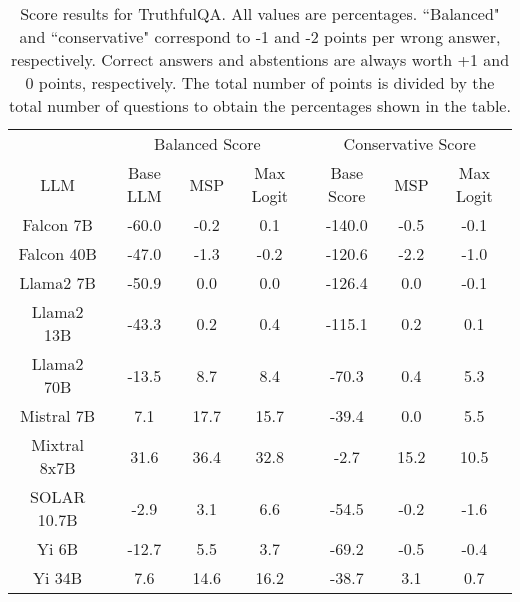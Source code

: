 \renewcommand\arraystretch{1.2}
\begin{table*}
\centering
\begin{tabular}{c|c|c|c|c|c|c}
& \multicolumn{3}{c|}{Balanced Score} & \multicolumn{3}{c}{Conservative Score} \\ 
LLM & Base LLM & MSP & Max Logit & Base Score & MSP & Max Logit\\ \hline
Falcon 7B & -60.0 & -0.2 & 0.1 & -140.0 & -0.5 & -0.1\\
Falcon 40B & -47.0 & -1.3 & -0.2 & -120.6 & -2.2 & -1.0\\
Llama2 7B & -50.9 & 0.0 & 0.0 & -126.4 & 0.0 & -0.1\\
Llama2 13B & -43.3 & 0.2 & 0.4 & -115.1 & 0.2 & 0.1\\
Llama2 70B & -13.5 & 8.7 & 8.4 & -70.3 & 0.4 & 5.3\\
Mistral 7B & 7.1 & 17.7 & 15.7 & -39.4 & 0.0 & 5.5\\
Mixtral 8x7B & 31.6 & 36.4 & 32.8 & -2.7 & 15.2 & 10.5\\
SOLAR 10.7B & -2.9 & 3.1 & 6.6 & -54.5 & -0.2 & -1.6\\
Yi 6B & -12.7 & 5.5 & 3.7 & -69.2 & -0.5 & -0.4\\
Yi 34B & 7.6 & 14.6 & 16.2 & -38.7 & 3.1 & 0.7\\
\hline
\end{tabular}
\caption{Score results for TruthfulQA. All values are percentages. ``Balanced" and ``conservative" correspond to -1 and -2 points per wrong answer, respectively. Correct answers and abstentions are always worth +1 and 0 points, respectively. The total number of points is divided by the total number of questions to obtain the percentages shown in the table.}
\label{tab:truthfulqa_score}
\end{table*}
